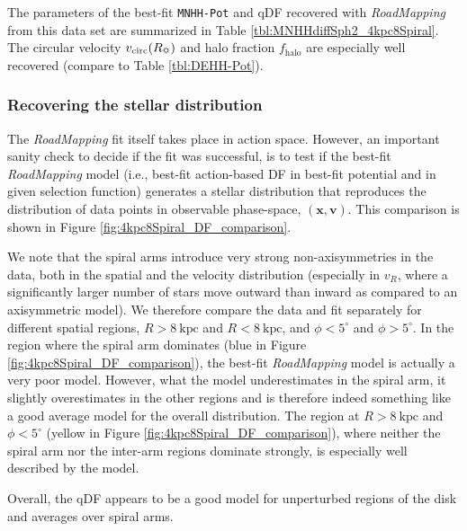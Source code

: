 \documentclass[iop,revtex4,numberedappendix,appendixfloats]{emulateapj}
\newcommand{\vect}[1]{\boldsymbol{#1}}
\newcommand{\RM}{{\sl RoadMapping}}
\begin{document}
The parameters of the best-fit \texttt{MNHH-Pot} and qDF recovered with \RM{} from this data set are summarized in Table \ref{tbl:MNHHdiffSph2_4kpc8Spiral}. The circular velocity $v_\text{circ}(R_\text{\sun})$ and halo fraction $f_\text{halo}$ are especially well recovered (compare to Table \ref{tbl:DEHH-Pot}).

\subsubsection{Recovering the stellar distribution} \label{sec:4kpc8Spiral_DF}

The \RM{} fit itself takes place in action space. However, an important sanity check to decide if the fit was successful, is to test if the best-fit \RM{} model (i.e., best-fit action-based DF in best-fit potential and in given selection function) generates a stellar distribution that reproduces the distribution of data points in observable phase-space, $(\vect{x},\vect{v})$. This comparison is shown in Figure \ref{fig:4kpc8Spiral_DF_comparison}. 

We note that the spiral arms introduce very strong non-axisymmetries in the data, both in the spatial and the velocity distribution (especially in $v_R$, where a significantly larger number of stars move outward than inward as compared to an axisymmetric model). We therefore compare the data and fit separately for different spatial regions, $R>8~\text{kpc}$ and $R<8~\text{kpc}$, and $\phi<5^\circ$ and $\phi>5^\circ$. In the region where the spiral arm dominates (blue in Figure \ref{fig:4kpc8Spiral_DF_comparison}), the best-fit \RM{} model is actually a very poor model. However, what the model underestimates in the spiral arm, it slightly overestimates in the other regions and is therefore indeed something like a good average model for the overall distribution. The region at $R>8~\text{kpc}$ and $\phi<5^\circ$ (yellow in Figure \ref{fig:4kpc8Spiral_DF_comparison}), where neither the spiral arm nor the inter-arm regions dominate strongly, is especially well described by the model. 

Overall, the qDF appears to be a good model for unperturbed regions of the disk and averages over spiral arms.
\end{document}
